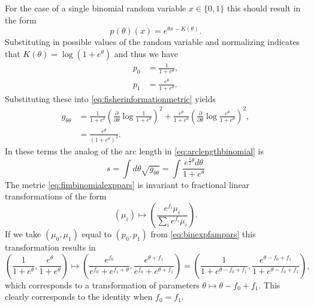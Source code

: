 For the case of a single binomial random variable $x \in \{0,1\}$ this should result in the form
\begin{equation}
    p(\theta)(x) = e^{\theta x - K(\theta)}.
\end{equation}
Substituting in possible values of the random variable and normalizing indicates that $K(\theta) = \log (1+e^{\theta})$ and thus we have
\begin{equation}\label{eq:binexpfampars}
    \begin{aligned}
        p_0 &= \frac{1}{1+e^{\theta}},\\
        p_1 &= \frac{e^{\theta}}{1+e^{\theta}}.
    \end{aligned}
\end{equation}
Substituting these into \ref{eq:fisherinformationmetric} yields
\begin{equation}\label{eq:fimbinomialexppars}
    \begin{aligned}
        g_{\theta \theta} &= \frac{1}{1+e^{\theta}} \left( \frac{\partial}{\partial \theta} \log \frac{1}{1+e^{\theta}} \right)^2 + \frac{e^{\theta}}{1+e^{\theta}} \left( \frac{\partial}{\partial \theta} \log \frac{e^{\theta}}{1+e^{\theta}} \right)^2,\\
                          &= \frac{e^{\theta}}{(1+e^{\theta})^2}.
     \end{aligned}
 \end{equation}
In these terms the analog of the arc length in \ref{eq:arclengthbinomial} is
\begin{equation}\label{eq:arclengthbinomialexppar}
    s = \int d \theta \sqrt{g_{\theta \theta}} = \int \frac{e^{\frac{1}{2} \theta} d\theta}{1+e^{\theta}}
\end{equation}
The metric \ref{eq:fimbinomialexppars} is invariant to fractional linear transformations of the form
\begin{equation}
    (\mu_i) \mapsto \left( \frac{e^{f_i}\mu_i}{\sum_i e^{f_i}\mu_i} \right).
\end{equation}
If we take $(\mu_0,\mu_1)$ equal to $(p_0,p_1)$ from \ref{eq:binexpfampars} this transformation results in
\begin{equation}
    \left(\frac{1}{1+e^{\theta}}, \frac{e^{\theta}}{1+e^{\theta}} \right)
    \mapsto
    \left(\frac{e^{f_0}}{e^{f_0}+e^{f_1+\theta}}, \frac{e^{\theta+f_1}}{e^{f_0}+e^{\theta+f_1}} \right)=\left(\frac{1}{1+e^{\theta - f_0 + f_1}}, \frac{e^{\theta - f_0 + f_1}}{1+e^{\theta - f_0 + f_1}} \right),
\end{equation}
which corresponds to a transformation of parameters $\theta \mapsto \theta-f_0+f_1$. This clearly corresponds to the identity when $f_0=f_1$.
